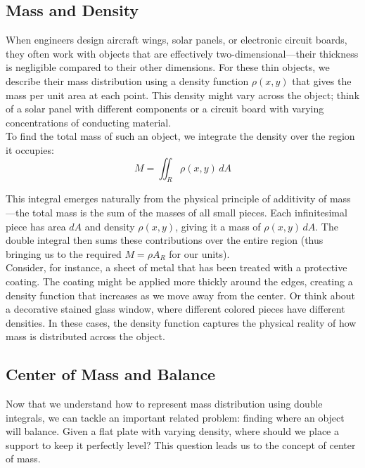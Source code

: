 \subsection*{Mass and Density} 

\noindent When engineers design aircraft wings, solar panels, or electronic circuit boards, they often work with objects that are effectively two-dimensional—their thickness is negligible compared to their other dimensions. For these thin objects, we describe their mass distribution using a density function $\rho(x,y)$ that gives the mass per unit area at each point. This density might vary across the object; think of a solar panel with different components or a circuit board with varying concentrations of conducting material. \\

\noindent To find the total mass of such an object, we integrate the density over the region it occupies:
\[
M = \iint_R \rho(x,y)\,dA
\]

\noindent This integral emerges naturally from the physical principle of additivity of mass—the total mass is the sum of the masses of all small pieces. Each infinitesimal piece has area $dA$ and density $\rho(x,y)$, giving it a mass of $\rho(x,y)\,dA$. The double integral then sums these contributions over the entire region (thus bringing us to the required $M = \rho A_R$ for our units). \\

\noindent Consider, for instance, a sheet of metal that has been treated with a protective coating. The coating might be applied more thickly around the edges, creating a density function that increases as we move away from the center. Or think about a decorative stained glass window, where different colored pieces have different densities. In these cases, the density function captures the physical reality of how mass is distributed across the object.

\subsection*{Center of Mass and Balance} 

\noindent Now that we understand how to represent mass distribution using double integrals, we can tackle an important related problem: finding where an object will balance. Given a flat plate with varying density, where should we place a support to keep it perfectly level? This question leads us to the concept of center of mass. \\

